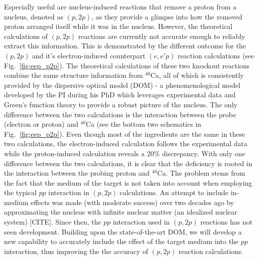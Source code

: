 \documentclass[12pt]{article}
\begin{document}
Especially useful are nucleus-induced reactions that remove a proton from a nucleus, denoted as $(p,2p)$, as they
provide a glimpse into how the removed proton arranged itself while it was in the nucleus. However, the theoretical
calculations of $(p,2p)$ reactions are currently not accurate enough to reliably extract this information. This is
demonstrated by the different outcome for the $(p,2p)$ and it's electron-induced counterpart $(e,e'p)$ reaction
calculations (see Fig.~\ref{fig:eep_p2p}).
The theoretical calculations of these two knockout reactions combine the same structure information from
$^{40}$Ca, all of which is consistently provided by the dispersive optical model (DOM) - a phenomenological model
developed by the PI during his PhD which leverages experimental data and Green's function theory to provide a robust
picture of the nucleus. The only difference between the two
calculations is the interaction between the probe (electron or proton) and $^{40}$Ca (see the bottom two schematics in
Fig.~\ref{fig:eep_p2p}). Even though most of the ingredients are the same in these two calculations, 
the electron-induced calculation follows the experimental data while the proton-induced calculation reveals a 20\%
discrepancy.
With only one difference between the two calculations, it is clear that the
deficiency is rooted in the interaction between the probing proton and $^{40}$Ca. The problem stems from the fact that the medium of the target is not taken into account when
employing the typical $pp$ interaction in $(p,2p)$ calculations. An attempt to include in-medium effects was made (with moderate success) over two decades ago by approximating the nucleus with infinite
nuclear matter (an idealized nuclear system) [CITE]. Since then, the $pp$ interaction used in $(p,2p)$ reactions has not seen development.
Building upon the state-of-the-art DOM, we will develop a new capability to accurately include the effect of the target medium into the $pp$ interaction, thus improving the
the accuracy of $(p,2p)$ reaction calculations.
\end{document}
